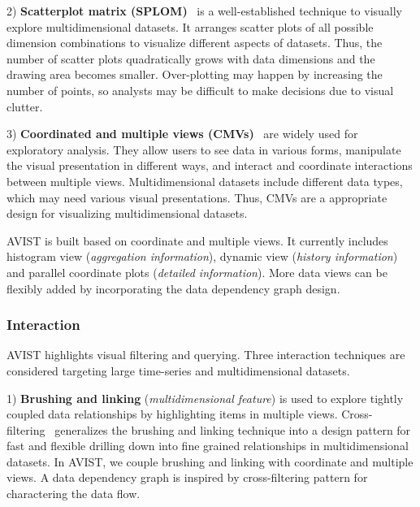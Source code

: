 2) \textbf{Scatterplot matrix (SPLOM)}~\cite{ Elmqvist2008g} is a well-established technique to visually explore multidimensional datasets.
It arranges scatter plots of all possible dimension combinations to visualize different aspects of datasets. 
Thus, the number of scatter plots quadratically grows with  data dimensions and the drawing area becomes smaller. 
Over-plotting may happen by increasing the number of points, so analysts may be difficult to make decisions due to visual clutter. 

3) \textbf{Coordinated and multiple views (CMVs)}~\cite{ Roberts} are widely used for exploratory analysis. 
They allow users to see  data in various forms, manipulate the visual presentation in different ways,  and interact and coordinate interactions between multiple views.  
Multidimensional datasets include different data types, which may need various visual presentations. Thus, CMVs are a appropriate design for visualizing multidimensional datasets.



AVIST is built based on coordinate and multiple views. It currently includes histogram view (\textit{aggregation information}), dynamic view (\textit{history information}) and parallel coordinate plots (\textit{detailed information}). More data views can be flexibly added by incorporating the data dependency graph design. 

\subsubsection{Interaction}
AVIST highlights visual filtering and querying. Three interaction techniques are considered targeting large time-series and multidimensional datasets.

 

1) \textbf{Brushing and linking} (\textit{multidimensional feature}) is used to explore tightly coupled data relationships by highlighting items in multiple views. 
Cross-filtering~\cite{weaver2010cross} generalizes the brushing and linking technique into a design pattern for fast and flexible  drilling down into fine grained relationships in multidimensional datasets. In AVIST, we couple brushing and linking with coordinate and multiple views. A data dependency graph is inspired by cross-filtering pattern for charactering the data flow.


